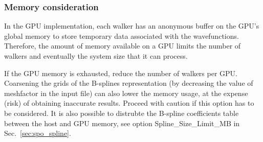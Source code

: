 
\subsubsection{Memory consideration}

In the GPU implementation, each walker has an anonymous buffer on the GPU's global memory to store temporary data associated with the wavefunctions. Therefore, the amount of memory available on a GPU limits the number of walkers and eventually the system size that it can process.

If the GPU memory is exhausted, reduce the number of walkers per GPU.
Coarsening the grids of the B-splines representation (by decreasing the value of meshfactor in the input file) can also lower the memory usage,
at the expense (risk) of obtaining inaccurate results. Proceed with caution if this option has to be considered.
It is also possible to distrubte the B-spline coefficients table between the host and GPU memory, see option Spline\_Size\_Limit\_MB in Sec.~\ref{sec:spo_spline}.
